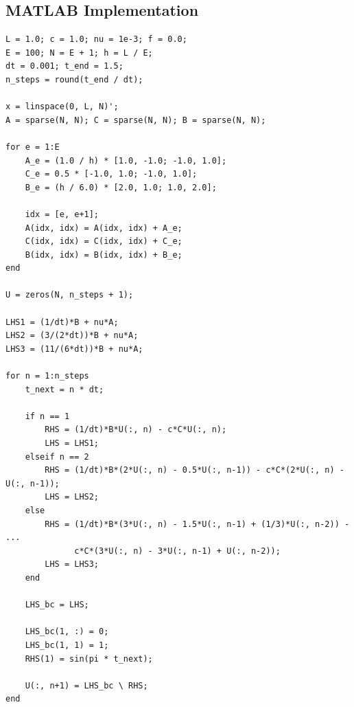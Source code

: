 \documentclass{article}
\begin{document}
\subsection*{MATLAB Implementation}
\begin{lstlisting}
L = 1.0; c = 1.0; nu = 1e-3; f = 0.0;
E = 100; N = E + 1; h = L / E;
dt = 0.001; t_end = 1.5;
n_steps = round(t_end / dt);

x = linspace(0, L, N)';
A = sparse(N, N); C = sparse(N, N); B = sparse(N, N);

for e = 1:E
    A_e = (1.0 / h) * [1.0, -1.0; -1.0, 1.0];
    C_e = 0.5 * [-1.0, 1.0; -1.0, 1.0];
    B_e = (h / 6.0) * [2.0, 1.0; 1.0, 2.0];
    
    idx = [e, e+1];
    A(idx, idx) = A(idx, idx) + A_e;
    C(idx, idx) = C(idx, idx) + C_e;
    B(idx, idx) = B(idx, idx) + B_e;
end

U = zeros(N, n_steps + 1);

LHS1 = (1/dt)*B + nu*A;
LHS2 = (3/(2*dt))*B + nu*A;
LHS3 = (11/(6*dt))*B + nu*A;

for n = 1:n_steps
    t_next = n * dt;
    
    if n == 1
        RHS = (1/dt)*B*U(:, n) - c*C*U(:, n);
        LHS = LHS1;
    elseif n == 2
        RHS = (1/dt)*B*(2*U(:, n) - 0.5*U(:, n-1)) - c*C*(2*U(:, n) - U(:, n-1));
        LHS = LHS2;
    else
        RHS = (1/dt)*B*(3*U(:, n) - 1.5*U(:, n-1) + (1/3)*U(:, n-2)) - ...
              c*C*(3*U(:, n) - 3*U(:, n-1) + U(:, n-2));
        LHS = LHS3;
    end
    
    LHS_bc = LHS;
    
    LHS_bc(1, :) = 0; 
    LHS_bc(1, 1) = 1; 
    RHS(1) = sin(pi * t_next);
    
    U(:, n+1) = LHS_bc \ RHS;
end
\end{lstlisting}
\end{document}
